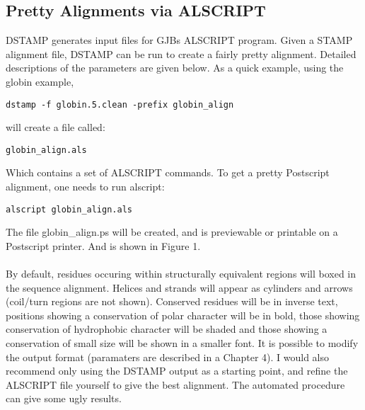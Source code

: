 \subsection{Pretty Alignments via ALSCRIPT}

DSTAMP generates input files for GJBs ALSCRIPT program.  Given a STAMP 
alignment file, DSTAMP can be run to create a fairly pretty alignment.
Detailed descriptions of the parameters are given below.  As a quick 
example, using the globin example,\\

\begin{scriptsize}\begin{verbatim}
dstamp -f globin.5.clean -prefix globin_align
\end{verbatim} \end{scriptsize}

will create a file called:

\begin{scriptsize}\begin{verbatim}
globin_align.als
\end{verbatim} \end{scriptsize}

Which contains a set of ALSCRIPT commands.  To get a pretty Postscript alignment, one needs to
run alscript:\\

\begin{scriptsize}\begin{verbatim}
alscript globin_align.als
\end{verbatim} \end{scriptsize}

The file globin\_align.ps will be created, and is previewable or 
printable on a Postscript printer.  And is shown in Figure 1.\\
\\
By default, residues occuring within
structurally equivalent regions will boxed in the sequence alignment.
Helices and strands will appear as cylinders and arrows (coil/turn regions
are not shown).  Conserved residues will be in inverse text, positions
showing a conservation of polar character will be in bold, those showing
conservation of hydrophobic character will be shaded and those showing
a conservation of small size will be shown in a smaller font.
It is possible to modify the output format (paramaters are described in a Chapter 4).
I would also recommend only using the DSTAMP output as a starting point, and
refine the ALSCRIPT file yourself to give the best alignment.  The automated
procedure can give some ugly results.

